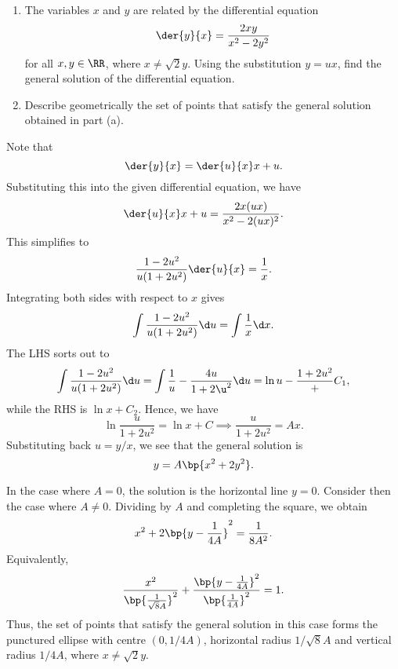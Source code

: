 \clearpage
\begin{problem}
    \begin{enumerate}
        \item The variables $x$ and $y$ are related by the differential equation \[\der{y}{x} = \frac{2xy}{x^2 - 2y^2}\] for all $x, y \in \RR$, where $x \neq \sqrt{2} y$. Using the substitution $y = ux$, find the general solution of the differential equation.
        \item Describe geometrically the set of points that satisfy the general solution obtained in part (a).
    \end{enumerate}
\end{problem}
\begin{solution}
    \begin{ppart}
        Note that \[\der{y}{x} = \der{u}{x} x + u.\] Substituting this into the given differential equation, we have \[\der{u}{x} x + u = \frac{2x(ux)}{x^2 - 2(ux)^2}.\] This simplifies to \[\frac{1-2u^2}{u(1+2u^2)} \der{u}{x} = \frac1x.\] Integrating both sides with respect to $x$ gives \[\int \frac{1-2u^2}{u(1+2u^2)} \d u = \int \frac1x \d x.\] The LHS sorts out to \[\int \frac{1-2u^2}{u(1+2u^2)} \d u  = \int \frac1u - \frac{4u}{1 + 2\u^2} \d u = \ln u - \frac{1 + 2u^2} + C_1,\] while the RHS is $\ln x + C_2$. Hence, we have \[\ln \frac{u}{1 + 2u^2} = \ln x + C \implies \frac{u}{1 + 2u^2} = A x.\] Substituting back $u = y/x$, we see that the general solution is \[y = A\bp{x^2 + 2y^2}.\]
    \end{ppart}
    \begin{ppart}
        In the case where $A = 0$, the solution is the horizontal line $y = 0$. Consider then the case where $A \neq 0$. Dividing by $A$ and completing the square, we obtain \[x^2 + 2\bp{y - \frac1{4A}}^2 = \frac1{8A^2}.\] Equivalently, \[\frac{x^2}{\bp{\frac1{\sqrt8 A}}^2} + \frac{\bp{y - \frac1{4A}}^2}{\bp{\frac1{4A}}^2} = 1.\] Thus, the set of points that satisfy the general solution in this case forms the punctured ellipse with centre $(0, 1/4A)$, horizontal radius $1/\sqrt{8} A$ and vertical radius $1/4A$, where $x \neq \sqrt{2}y$.
    \end{ppart}
\end{solution}

